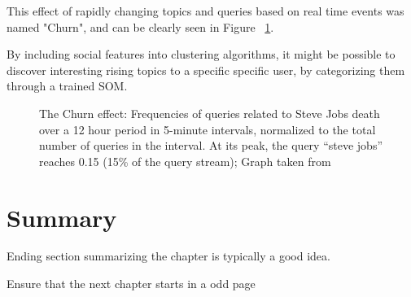 This effect of rapidly changing topics and queries based on real time events was named "Churn", and can be clearly seen in Figure ~\ref{fig:churn}.

By including social features into clustering algorithms, it might be possible to discover interesting rising topics to a specific specific user, by categorizing them through a trained \ac{SOM}.

\begin{figure}[tb]
  \begin{center}
    \noindent{}
  \end{center}
  \caption{The Churn effect: Frequencies of queries related to Steve Jobs death over a 12 hour period in 5-minute intervals, normalized to the total number of queries in the interval. At its peak, the query “steve jobs” reaches 0.15 (15\% of the query stream); Graph taken from~\cite{Lin2012}}
  \label{fig:churn}
\end{figure}


\section{Summary}
Ending section summarizing the chapter is typically a good idea.

Ensure that the next chapter starts in a odd page
\cleardoublepage 
